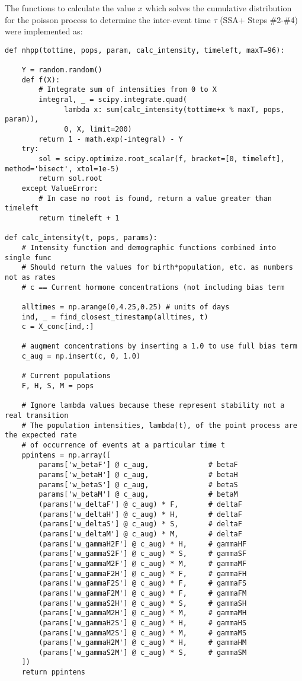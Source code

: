 \documentclass[11pt]{article}
\begin{document}
The functions to calculate the value $x$ which solves the cumulative distribution for the poisson process to determine the inter-event time $\tau$ (SSA+ Steps \#2-\#4) were implemented as:
\begin{Verbatim}[frame=single]
def nhpp(tottime, pops, param, calc_intensity, timeleft, maxT=96):

    Y = random.random()
    def f(X):
        # Integrate sum of intensities from 0 to X
        integral, _ = scipy.integrate.quad(
              lambda x: sum(calc_intensity(tottime+x % maxT, pops, param)),
              0, X, limit=200)
        return 1 - math.exp(-integral) - Y
    try:
        sol = scipy.optimize.root_scalar(f, bracket=[0, timeleft], method='bisect', xtol=1e-5)
        return sol.root
    except ValueError:
        # In case no root is found, return a value greater than timeleft
        return timeleft + 1
        
def calc_intensity(t, pops, params):
    # Intensity function and demographic functions combined into single func
    # Should return the values for birth*population, etc. as numbers not as rates
    # c == Current hormone concentrations (not including bias term

    alltimes = np.arange(0,4.25,0.25) # units of days
    ind, _ = find_closest_timestamp(alltimes, t)
    c = X_conc[ind,:]

    # augment concentrations by inserting a 1.0 to use full bias term
    c_aug = np.insert(c, 0, 1.0)

    # Current populations
    F, H, S, M = pops

    # Ignore lambda values because these represent stability not a real transition
    # The population intensities, lambda(t), of the point process are the expected rate
    # of occurrence of events at a particular time t
    ppintens = np.array([
        params['w_betaF'] @ c_aug,              # betaF
        params['w_betaH'] @ c_aug,              # betaH
        params['w_betaS'] @ c_aug,              # betaS
        params['w_betaM'] @ c_aug,              # betaM
        (params['w_deltaF'] @ c_aug) * F,       # deltaF
        (params['w_deltaH'] @ c_aug) * H,       # deltaF
        (params['w_deltaS'] @ c_aug) * S,       # deltaF
        (params['w_deltaM'] @ c_aug) * M,       # deltaF
        (params['w_gammaH2F'] @ c_aug) * H,     # gammaHF
        (params['w_gammaS2F'] @ c_aug) * S,     # gammaSF
        (params['w_gammaM2F'] @ c_aug) * M,     # gammaMF
        (params['w_gammaF2H'] @ c_aug) * F,     # gammaFH
        (params['w_gammaF2S'] @ c_aug) * F,     # gammaFS
        (params['w_gammaF2M'] @ c_aug) * F,     # gammaFM
        (params['w_gammaS2H'] @ c_aug) * S,     # gammaSH
        (params['w_gammaM2H'] @ c_aug) * M,     # gammaMH
        (params['w_gammaH2S'] @ c_aug) * H,     # gammaHS
        (params['w_gammaM2S'] @ c_aug) * M,     # gammaMS
        (params['w_gammaH2M'] @ c_aug) * H,     # gammaHM
        (params['w_gammaS2M'] @ c_aug) * S,     # gammaSM
    ])
    return ppintens
\end{Verbatim}
\end{document}
